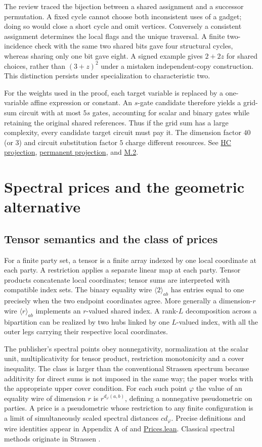\documentclass[11pt,letterpaper]{article}
\theoremstyle{definition}\newtheorem{definition}[theorem]{Definition}\newtheorem{example}[theorem]{Example}
\theoremstyle{remark}\newtheorem{remark}[theorem]{Remark}
\newcommand{\pub}[3]{\href{https://github.com/anthropics/formal-math/blob/11b6c7e3c927df2658f513b6b68ea7f8929c62c5/vp-vnp/#1\#L#2}{#3}}
\newcommand{\aud}[2]{\href{https://github.com/nousentllc/VP-VNP-Review/blob/567303d0bcf4f9d54390437b137752446e58ccd6/#1}{#2}}
\begin{document}
The review traced the bijection between a shared assignment and a successor permutation. A fixed cycle cannot choose both inconsistent uses of a gadget; doing so would close a short cycle and omit vertices. Conversely a consistent assignment determines the local flags and the unique traversal. A finite two-incidence check with the same two shared bits gave four structural cycles, whereas sharing only one bit gave eight. A signed example gives $2+2z$ for shared choices, rather than $(3+z)^2$ under a mistaken independent-copy construction. This distinction persists under specialization to characteristic two.

For the weights used in the proof, each target variable is replaced by a one-variable affine expression or constant. An $s$-gate candidate therefore yields a grid-sum circuit with at most $5s$ gates, accounting for scalar and binary gates while retaining the original shared references. Thus if the grid sum has a large complexity, every candidate target circuit must pay it. The dimension factor $40$ (or $3$) and circuit substitution factor $5$ charge different resources. See \aud{passes/12b-hamiltonian-projection.md}{HC projection}, \aud{passes/pass13C-permanent.md}{permanent projection}, and \pub{Paper/HcGrid.lean}{18}{M.2}.

\section{Spectral prices and the geometric alternative}\label{sec:geometry}
\subsection{Tensor semantics and the class of prices}
For a finite party set, a tensor is a finite array indexed by one local coordinate at each party. A restriction applies a separate linear map at each party. Tensor products concatenate local coordinates; tensor sums are interpreted with compatible index sets. The binary equality wire $\langle 2\rangle_{ab}$ has entries equal to one precisely when the two endpoint coordinates agree. More generally a dimension-$r$ wire $\langle r\rangle_{ab}$ implements an $r$-valued shared index. A rank-$L$ decomposition across a bipartition can be realized by two hubs linked by one $L$-valued index, with all the outer legs carrying their respective local coordinates.

The publisher's spectral points obey nonnegativity, normalization at the scalar unit, multiplicativity for tensor product, restriction monotonicity and a cover inequality. The class is larger than the conventional Strassen spectrum because additivity for direct sums is not imposed in the same way; the paper works with the appropriate upper cover condition. For each such point $\varphi$ the value of an equality wire of dimension $r$ is $r^{d_\varphi(a,b)}$, defining a nonnegative pseudometric on parties. A price is a pseudometric whose restriction to any finite configuration is a limit of simultaneously scaled spectral distances $c d_\varphi$. Precise definitions and wire identities appear in Appendix A of \cite{claude} and \pub{Paper/Prices.lean}{23}{Prices.lean}. Classical spectral methods originate in Strassen \cite{strassen}.
\end{document}
